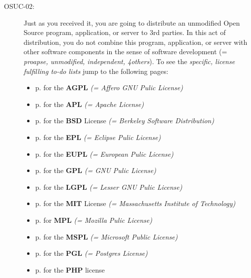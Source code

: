 \begin{description}
\item[OSUC-02:]\label{OSUC-02-DEF} Just as you received it, you are going to
distribute an unmodified Open Source program, application, or server to 3rd
parties. In this act of distribution, you do not combine this program,
application, or server with other software components in the sense of software
development (= \textit{proapse, unmodified, independent, 4others}). 
To see the \textit{specific, license fulfilling to-do lists} jump to the
following pages:
   \begin{itemize}
    \item p. \pageref{OSUC-02-AGPL} for the \textbf{AGPL}
      \textit{(= Affero GNU Pulic License)} 
    \item p. \pageref{OSUC-02-Apache20} for the \textbf{APL}
      \textit{(= Apache License)}
    \item p. \pageref{OSUC-02-BSD} for the \textbf{BSD} License
      \textit{(= Berkeley Software Distribution)}
    \item p. \pageref{OSUC-02-EPL} for the \textbf{EPL}
      \textit{(= Eclipse Pulic License)}     
    \item p. \pageref{OSUC-02-EUPL} for the \textbf{EUPL}
      \textit{(= European Pulic License)} 
    \item p. \pageref{OSUC-02-GPL} for the \textbf{GPL}
       \textit{(= GNU Pulic License)} 
    \item p. \pageref{OSUC-02-LGPL} for the \textbf{LGPL}
      \textit{(= Lesser GNU Pulic License)}           
    \item p. \pageref{OSUC-02-MIT} for the \textbf{MIT} License
       \textit{(= Massachusetts Institute of Technology)} 
    \item p. \pageref{OSUC-02-MPL} for \textbf{MPL}
      \textit{(= Mozilla Pulic License)}     
    \item p. \pageref{OSUC-02-MsPL} for the \textbf{MSPL}
      \textit{(= Microsoft Public License)} 
    \item p. \pageref{OSUC-02-PGL} for the \textbf{PGL}
      \textit{(= Postgres License)} 
    \item p. \pageref{OSUC-02-PHP} for the \textbf{PHP} license 
  \end{itemize}


\end{description}
